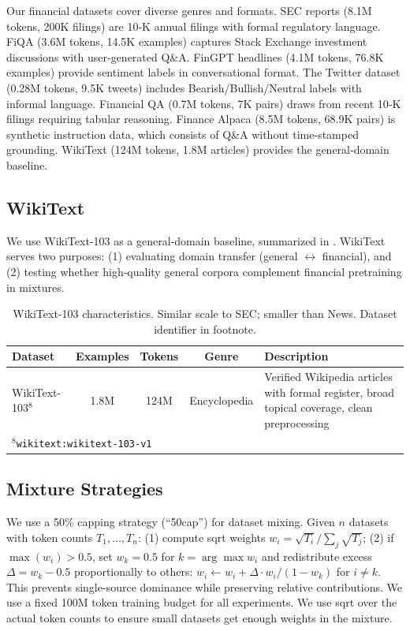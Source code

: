 Our financial datasets cover diverse genres and formats. SEC reports (8.1M tokens, 200K filings) are 10‑K annual filings with formal regulatory language. FiQA (3.6M tokens, 14.5K examples) captures Stack Exchange investment discussions with user‑generated Q\&A. FinGPT headlines (4.1M tokens, 76.8K examples) provide sentiment labels in conversational format. The Twitter dataset (0.28M tokens, 9.5K tweets) includes Bearish/Bullish/Neutral labels with informal language. Financial QA (0.7M tokens, 7K pairs) draws from recent 10‑K filings requiring tabular reasoning. Finance Alpaca (8.5M tokens, 68.9K pairs) is synthetic instruction data, which consists of Q\&A without time‑stamped grounding. WikiText (124M tokens, 1.8M articles) provides the general‑domain baseline.

\subsection{WikiText}

We use WikiText-103 \parencite{merity2016pointer} as a general‑domain baseline, summarized in . WikiText serves two purposes: (1) evaluating domain transfer (general $\leftrightarrow$ financial), and (2) testing whether high‑quality general corpora complement financial pretraining in mixtures.

\begin{table}[htbp]
\centering
\caption[WikiText Dataset Characteristics]{WikiText-103 characteristics. Similar scale to SEC; smaller than News. Dataset identifier in footnote.}
\label{tab:wikitext_dataset}
\small
\begin{tabular}{p{3.4cm}cccp{5.5cm}}
\toprule
\textbf{Dataset} & \textbf{Examples} & \textbf{Tokens} & \textbf{Genre} & \textbf{Description} \\
\midrule
WikiText-103$^8$ & 1.8M & 124M & Encyclopedia & Verified Wikipedia articles with formal register, broad topical coverage, clean preprocessing \\
\bottomrule
\multicolumn{5}{l}{\footnotesize $^8$\texttt{wikitext:wikitext-103-v1}}
\end{tabular}
\end{table}

\subsection{Mixture Strategies}

We use a 50\% capping strategy (``50cap'') for dataset mixing. Given $n$ datasets with token counts $T_1, \ldots, T_n$: (1) compute sqrt weights $w_i = \sqrt{T_i} / \sum_j \sqrt{T_j}$; (2) if $\max(w_i) > 0.5$, set $w_k = 0.5$ for $k = \arg\max w_i$ and redistribute excess $\Delta = w_k - 0.5$ proportionally to others: $w_i \gets w_i + \Delta \cdot w_i/(1-w_k)$ for $i \neq k$. This prevents single-source dominance while preserving relative contributions. We use a fixed 100M token training budget for all experiments. We use sqrt over the actual token counts to ensure small datasets get enough weights in the mixture.

